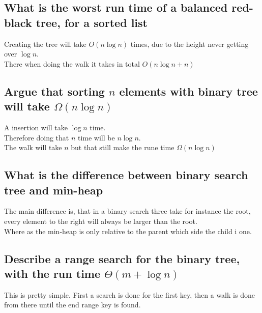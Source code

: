 \documentclass[12pt, a4paper]{article}
\begin{document}
			\subsection{What is the worst run time of a balanced red-black tree, for a sorted list}
				Creating the tree will take $O(n\log n)$ times, due to the height never getting over $\log n$.\\
				There when doing the walk it takes in total $O(n\log n + n)$
			\subsection{Argue that sorting $n$ elements with binary tree will take $\Omega(n\log n)$}
				A insertion will take $\log n$ time.\\
				Therefore doing that $n$ time will be $n\log n$.\\
				The walk will take $n$ but that still make the rune time $\Omega(n\log n)$
			\subsection{What is the difference between binary search tree and min-heap}
				The main difference is, that in a binary search three take for instance the root, every element to the right will always be larger than the root.\\
				Where as the min-heap is only relative to the parent which side the child i one.
			\subsection{Describe a range search for the binary tree, with the run time $\Theta(m+\log n)$}
				This is pretty simple. First a search is done for the first key, then a walk is done from there until the end range key is found.
			
				
				
\end{document}
